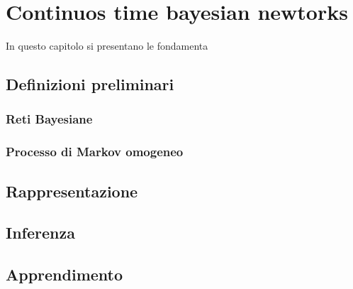 
\chapter{Continuos time bayesian newtorks}
\label{cap:ctbn}

In questo capitolo si presentano le fondamenta

\section{Definizioni preliminari}

\subsection{Reti Bayesiane}

\subsection{Processo di Markov omogeneo}

\section{Rappresentazione}

\section{Inferenza}


\section{Apprendimento}

